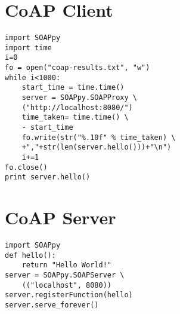 \documentclass[conference]{IEEEtran}
\begin{document}
\appendices

\section{CoAP Client}
\begin{lstlisting}
import SOAPpy
import time
i=0
fo = open("coap-results.txt", "w")
while i<1000:
	start_time = time.time()
	server = SOAPpy.SOAPProxy \
	("http://localhost:8080/")
	time_taken= time.time() \
	- start_time
	fo.write(str("%.10f" % time_taken) \
	+","+str(len(server.hello()))+"\n")
	i+=1
fo.close()
print server.hello()
\end{lstlisting}

\section{CoAP Server}
\begin{lstlisting}
import SOAPpy
def hello():
    return "Hello World!"
server = SOAPpy.SOAPServer \
	(("localhost", 8080))
server.registerFunction(hello)
server.serve_forever()
\end{lstlisting}

\end{document}
